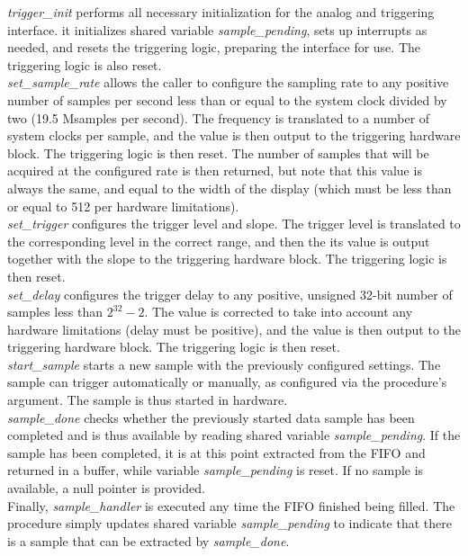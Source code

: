 \documentclass[titlepage]{scrartcl}
\begin{document}
	\textit{trigger\_init} performs all necessary initialization for the analog and triggering interface. it initializes shared variable \textit{sample\_pending}, sets up interrupts as needed, and resets the triggering logic, preparing the interface for use. The triggering logic is also reset. \\

	\textit{set\_sample\_rate} allows the caller to configure the sampling rate to any positive number of samples per second less than or equal to the system clock divided by two (19.5 Msamples per second). The frequency is translated to a number of system clocks per sample, and the value is then output to the triggering hardware block. The triggering logic is then reset. The number of samples that will be acquired at the configured rate is then returned, but note that this value is always the same, and equal to the width of the display (which must be less than or equal to 512 per hardware limitations).\\

	\textit{set\_trigger} configures the trigger level and slope. The trigger level is translated to the corresponding level in the correct range, and then the its value is output together with the slope to the triggering hardware block. The triggering logic is then reset. \\

	\textit{set\_delay} configures the trigger delay to any positive, unsigned 32-bit number of samples less than $2^32 - 2$. The value is corrected to take into account any hardware limitations (delay must be positive), and the value is then output to the triggering hardware block. The triggering logic is then reset. \\

	\textit{start\_sample} starts a new sample with the previously configured settings. The sample can trigger automatically or manually, as configured via the procedure's argument. The sample is thus started in hardware. \\
	
	\textit{sample\_done} checks whether the previously started data sample has been completed and is thus available by reading shared variable \textit{sample\_pending}. If the sample has been completed, it is at this point extracted from the FIFO and returned in a buffer, while variable \textit{sample\_pending} is reset. If no sample is available, a null pointer is provided. \\

	Finally, \textit{sample\_handler} is executed any time the FIFO finished being filled. The procedure simply updates shared variable \textit{sample\_pending} to indicate that there is a sample that can be extracted by \textit{sample\_done}.
\end{document}

